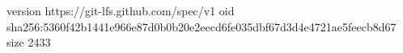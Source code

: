 version https://git-lfs.github.com/spec/v1
oid sha256:5360f42b1441e966e87d0b0b20e2eecd6fe035dbf67d3d4e4721ae5feecb8d67
size 2433
